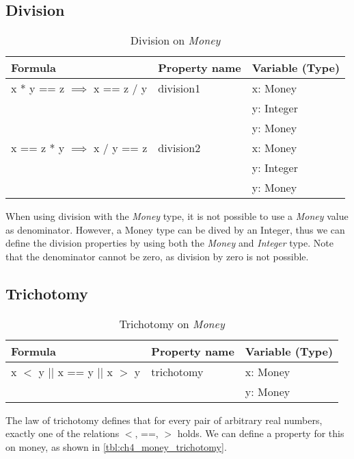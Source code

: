 \subsection{Division}
\begin{table}[h!]
\centering
\begin{tabular}{|lll|}
\hline
                        \textbf{Formula}                 & \textbf{Property name} & \textbf{Variable (Type)} \\ \hline
\rowcolor[HTML]{EFEFEF} x * y == z $\implies$ x == z / y & division1              & x: Money                 \\
\rowcolor[HTML]{EFEFEF}                                  &                        & y: Integer               \\ 
\rowcolor[HTML]{EFEFEF}                                  &                        & y: Money                 \\ 
                        x == z * y $\implies$ x / y == z & division2              & x: Money                 \\
                                                         &                        & y: Integer               \\
                                                         &                        & y: Money                 \\ \hline
\end{tabular}
\caption{Division on \textit{Money}}
\label{tbl:ch4_money_division}
\end{table}
When using division with the \textit{Money} type, it is not possible to use a \textit{Money} value as denominator. However, a Money type can be dived by an Integer, thus we can define the division properties by using both the \textit{Money} and \textit{Integer} type. Note that the denominator cannot be zero, as division by zero is not possible. %

\subsection{Trichotomy}
\begin{table}[h!]
\centering
\begin{tabular}{|lll|}
\hline
                        \textbf{Formula}             & \textbf{Property name} & \textbf{Variable (Type)} \\ \hline
\rowcolor[HTML]{EFEFEF} x $<$ y || x == y || x $>$ y & trichotomy             & x: Money                 \\
\rowcolor[HTML]{EFEFEF}                              &                        & y: Money                 \\ \hline
\end{tabular}
\caption{Trichotomy on \textit{Money}}
\label{tbl:ch4_money_trichotomy}
\end{table}
The law of trichotomy defines that for every pair of arbitrary real numbers, exactly one of the relations $<$, ==, $>$ holds. We can define a property for this on money, as shown in \autoref{tbl:ch4_money_trichotomy}.



